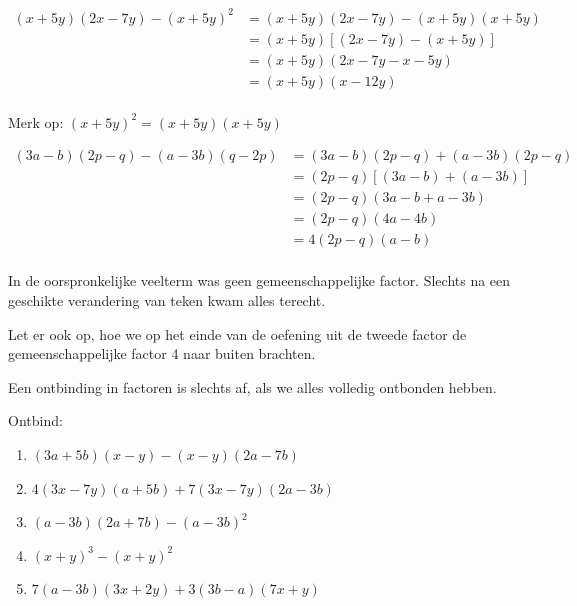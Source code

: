 \documentclass{bis}
\begin{document}
\begin{voorbeeld}
\begin{align*}
(x + 5y) (2x - 7y) - (x + 5y)^2
&= (x + 5y) (2x - 7y) - (x + 5y) (x + 5y)\\
&= (x + 5y) [(2x - 7y) - (x + 5y)]\\
&= (x + 5y) (2x - 7y - x - 5y)\\
&= (x + 5y) (x - 12y)\\
\end{align*}

Merk op: $(x + 5y)^2 = (x + 5y) (x + 5y)$
\end{voorbeeld}

\begin{voorbeeld}
\begin{align*}
(3a - b) (2p - q) - (a - 3b) (q - 2p)
&= (3a - b) (2p - q) + (a - 3b) (2p - q)\\
&= (2p - q) [(3a - b) + (a - 3b)]\\
&= (2p - q) (3a - b + a- 3b)\\
&= (2p - q) (4a - 4b)\\
&= 4 (2p- q) (a - b)\\
\end{align*}

In de oorspronkelijke veelterm was geen gemeenschappelijke factor. Slechts na een geschikte verandering van teken kwam alles terecht.

Let er ook op, hoe we op het einde van de oefening uit de tweede factor de gemeenschappelijke factor 4 naar buiten brachten.
\end{voorbeeld}

Een ontbinding in factoren is slechts af, als we alles volledig ontbonden hebben.

\begin{exercise}
Ontbind:
\begin{enumerate}
  \item $(3a + 5b) (x - y) - (x - y) (2a - 7b)$
  \item $4 (3x - 7y) (a + 5b) + 7 (3x - 7y) (2a - 3b)$
  \item $(a - 3b) (2a + 7b) - (a - 3b)^2$
  \item $(x + y)^3 - (x + y)^2$
  \item $7 (a - 3b) (3x + 2y) + 3 (3b - a) (7x + y)$
\end{enumerate}
\end{exercise}
\end{document}
